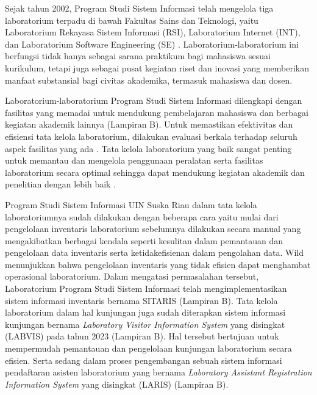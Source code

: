 Sejak tahun 2002, Program Studi Sistem Informasi telah mengelola tiga laboratorium terpadu di bawah Fakultas Sains dan Teknologi, yaitu Laboratorium Rekayasa Sistem Informasi (RSI), Laboratorium Internet (INT), dan Laboratorium Software Engineering (SE) \cite{labsi2023}. Laboratorium-laboratorium ini berfungsi tidak hanya sebagai sarana praktikum bagi mahasiswa sesuai kurikulum, tetapi juga sebagai pusat kegiatan riset dan inovasi yang memberikan manfaat substansial bagi civitas akademika, termasuk mahasiswa dan dosen.

Laboratorium-laboratorium Program Studi Sistem Informasi dilengkapi dengan fasilitas yang memadai untuk mendukung pembelajaran mahasiswa dan berbagai kegiatan akademik lainnya (Lampiran B). Untuk memastikan efektivitas dan efisiensi tata kelola laboratorium, dilakukan evaluasi berkala terhadap seluruh aspek fasilitas yang ada \cite{labsi2023}. Tata kelola laboratorium yang baik sangat penting untuk memantau dan mengelola penggunaan peralatan serta fasilitas laboratorium secara optimal sehingga dapat mendukung kegiatan akademik dan penelitian dengan lebih baik \cite{dongapure2024good}.

Program Studi Sistem Informasi UIN Suska Riau dalam tata kelola laboratoriumnya sudah dilakukan dengan beberapa cara yaitu mulai dari pengelolaan inventaris laboratorium sebelumnya dilakukan secara manual yang mengakibatkan berbagai kendala seperti kesulitan dalam pemantauan dan pengelolaan data inventaris serta ketidakefisienan dalam pengolahan data. Wild \citeyear{smith2021agile} menunjukkan bahwa pengelolaan inventaris yang tidak efisien dapat menghambat operasional laboratorium. Dalam mengatasi permasalahan tersebut, Laboratorium Program Studi Sistem Informasi telah mengimplementasikan sistem informasi inventaris bernama SITARIS (Lampiran B). Tata kelola laboratorium dalam hal kunjungan juga sudah diterapkan sistem informasi kunjungan bernama \textit{Laboratory Visitor Information System} yang disingkat (LABVIS) pada tahun 2023 (Lampiran B). Hal tersebut bertujuan untuk mempermudah pemantauan dan pengelolaan kunjungan laboratorium secara efisien. Serta sedang dalam proses pengembangan sebuah sistem informasi pendaftaran asisten laboratorium yang bernama \textit{Laboratory Assistant Registration Information System} yang disingkat (LARIS) (Lampiran B).


